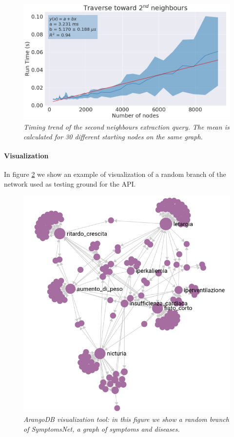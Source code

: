 \documentclass[11pt,twocolumn]{article}
\begin{document}
\begin{figure}[ht!]
   \includegraphics[width=\linewidth]{images/traverse_0_2_readable.png}
   \caption{\small{\textit{Timing trend of the second neighbours extraction query. The mean is calculated for 30 different starting nodes on the same graph.}}}
   \label{fig:tr_0_2}
\end{figure}

\newpage

\paragraph{Visualization}
In figure \ref{fig:3} we show an example of visualization of a random branch of the network used as testing ground for the API.

\begin{figure}[ht!]
   \includegraphics[width=\linewidth]{images/Sym_Net_crop.png}
   \caption{\small{\textit{ArangoDB visualization tool: in this figure we show a random branch of SymptomsNet, a graph of symptoms and diseases.}}}
   \label{fig:3}
\end{figure}
\end{document}
